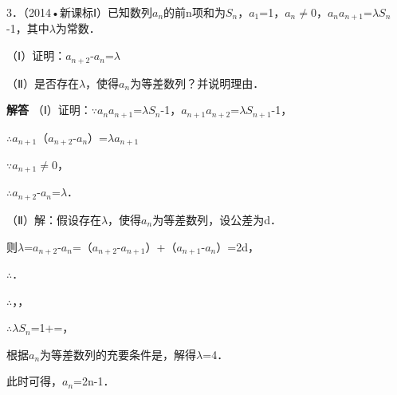 3．（2014•新课标Ⅰ）已知数列{\ensuremath{a_{n}}}的前n项和为\ensuremath{S_{n}}，\ensuremath{a_{1}}=1，\ensuremath{a_{n}}\ensuremath{\ne}0，\ensuremath{a_{n}}\ensuremath{a_{n+1}}=\ensuremath{\lambda}\ensuremath{S_{n}}-1，其中\ensuremath{\lambda}为常数．\par
（Ⅰ）证明：\ensuremath{a_{n+2}}-\ensuremath{a_{n}}=\ensuremath{\lambda}\par
（Ⅱ）是否存在\ensuremath{\lambda}，使得{\ensuremath{a_{n}}}为等差数列？并说明理由．\par
\QuestionSpace{4.8cm}
\ifshowanswers
\par\begingroup\color{solutioncolor}\noindent\textbf{解答}\quad
（Ⅰ）证明：\ensuremath{\because}\ensuremath{a_{n}}\ensuremath{a_{n+1}}=\ensuremath{\lambda}\ensuremath{S_{n}}-1，\ensuremath{a_{n+1}}\ensuremath{a_{n+2}}=\ensuremath{\lambda}\ensuremath{S_{n+1}}-1，\par
\ensuremath{\therefore}\ensuremath{a_{n+1}}（\ensuremath{a_{n+2}}-\ensuremath{a_{n}}）=\ensuremath{\lambda}\ensuremath{a_{n+1}}\par
\ensuremath{\because}\ensuremath{a_{n+1}}\ensuremath{\ne}0，\par
\ensuremath{\therefore}\ensuremath{a_{n+2}}-\ensuremath{a_{n}}=\ensuremath{\lambda}．\par
（Ⅱ）解：假设存在\ensuremath{\lambda}，使得{\ensuremath{a_{n}}}为等差数列，设公差为d．\par
则\ensuremath{\lambda}=\ensuremath{a_{n+2}}-\ensuremath{a_{n}}=（\ensuremath{a_{n+2}}-\ensuremath{a_{n+1}}）+（\ensuremath{a_{n+1}}-\ensuremath{a_{n}}）=2d，\par
\ensuremath{\therefore}．\par
\ensuremath{\therefore}，，\par
\ensuremath{\therefore}\ensuremath{\lambda}\ensuremath{S_{n}}=1+=，\par
根据{\ensuremath{a_{n}}}为等差数列的充要条件是，解得\ensuremath{\lambda}=4．\par
此时可得，\ensuremath{a_{n}}=2n-1．\par
\par\endgroup\fi

